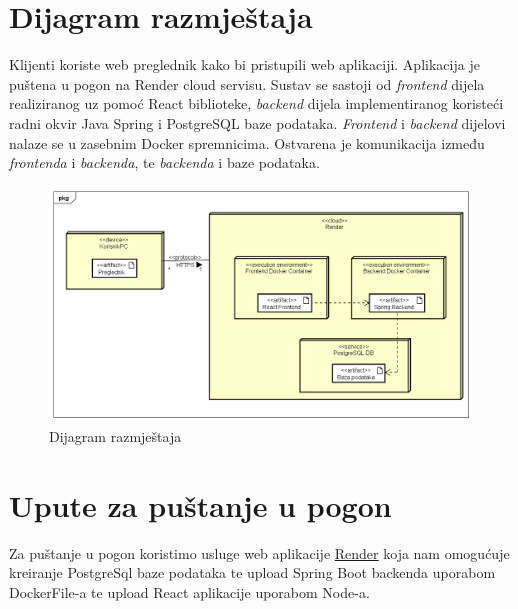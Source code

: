 			\eject 
		
		
		\section{Dijagram razmještaja}
			
			{Klijenti koriste web preglednik kako bi pristupili web aplikaciji. Aplikacija je puštena u pogon na Render cloud servisu. Sustav se sastoji od \textit{frontend} dijela realiziranog uz pomoć React biblioteke, \textit{backend} dijela implementiranog koristeći radni okvir Java Spring i PostgreSQL baze podataka. \textit{Frontend} i \textit{backend} dijelovi nalaze se u zasebnim Docker spremnicima. Ostvarena je komunikacija između \textit{frontenda} i \textit{backenda}, te \textit{backenda} i baze podataka.}
	\begin{figure}[H]
		\includegraphics[scale= 0.45]{slike/Deployment Diagram0.png}
		\centering
		\caption{Dijagram razmještaja}
		\label{fig:Dijagram razmještaja}
	\end{figure} 
			
			\eject 
		
		\section{Upute za puštanje u pogon}
			
			 \noindent Za puštanje u pogon koristimo usluge web aplikacije \href{www.render.com}{Render} koja nam omogućuje kreiranje PostgreSql baze podataka te upload Spring Boot backenda uporabom DockerFile-a te upload React aplikacije uporabom Node-a.\newline
			 
